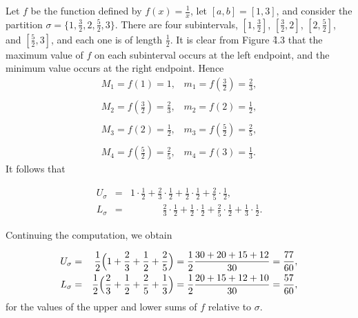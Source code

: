 \begin{example}
Let $f$ be the function defined by $f(x) = \frac{1}{x}$, let $[a, b] = [1, 3]$, and consider the partition $\sigma = \{ 1, \frac{3}{2}, 2, \frac{5}{2}, 3 \}$.  There are four subintervals, $[1, \frac{3}{2}]$, $[\frac{3}{2}, 2]$, $[2, \frac{5}{2}]$, and $[\frac{5}{2}, 3]$, and each one is of length $\frac{1}{2}$. It is clear from
Figure \f{4.3} that the maximum value of $f$ on each subinterval occurs at the left endpoint, and the minimum value occurs at the right endpoint. Hence
$$
\begin{array}{l}
M_1 = f(1) = 1,                      \;\;\; m_1 = f(\frac{3}{2}) = \frac{2}{3}, \\
\\
M_2 = f(\frac{3}{2}) = \frac{2}{3},         \;\;\; m_2 = f(2) = \frac{1}{2}, \\
\\
M_3 = f(2) = \frac{1}{2},          \;\;\; m_3 = f(\frac{5}{2}) = \frac{2}{5}, \\
\\
M_4 = f(\frac{5}{2}) = \frac{2}{5}, \;\;\; m_4 = f(3) = \frac{1}{3}.
\end{array}
$$
\noindent It follows that 

\begin{eqnarray*}
U_{\sigma} &=& 1 \cdot \frac{1}{2} + \frac{2}{3} \cdot \frac{1}{2} + \frac{1}{2} \cdot \frac{1}{2} + \frac{2}{5} \cdot
\frac{1}{2}, \\
 L_{\sigma} &=& \;\;\;\;\;\;\;\;\;\;\;\; \frac{2}{3} \cdot \frac{1}{2} + \frac{1}{2} \cdot \frac{1}{2} + \frac{2}{5} \cdot
\frac{1}{2} +
\frac{1}{3} \cdot \frac{1}{2}.
\end{eqnarray*}
  

\noindent Continuing the computation, we obtain

\begin{eqnarray*}
U_{\sigma} &=& \frac{1}{2} \Bigl(1 + \frac{2}{3} + \frac{1}{2} + \frac{2}{5} \Bigr) = \frac{1}{2} \frac{ 30 + 20 + 15 +
12}{30} =
\frac{77}{60},  \\ 
L_{\sigma} &=& \frac{1}{2} \Bigl( \frac{2}{3} + \frac{1}{2} + \frac{2}{5} + \frac{1}{3} \Bigr) = \frac{1}{2}
\frac{ 20 + 15 + 12 + 10}{30} = \frac{57}{60}, 
\end{eqnarray*}
\noindent for the values of the upper and lower sums of $f$ relative to $\sigma$.
\end{example}
\medskip

